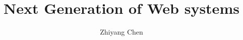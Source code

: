 \documentclass{ut-thesis}
\author{Zhiyang Chen}
\title{Next Generation of Web systems}
\begin{document}
\begin{preliminary}

\maketitle


\begin{abstract}
\end{abstract}







\end{preliminary}
\end{document}
